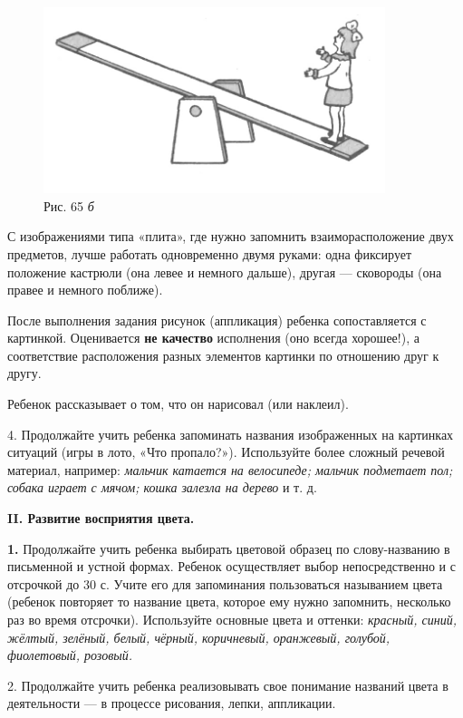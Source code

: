 \documentclass{book}
\renewcommand{\emph}[1]{\textit{#1}}
\begin{document}
\begin{figure}
\centering
\includegraphics[width=3.93174in,height=2.13694in]{media/media/image63.jpg}
\caption*{Рис. 65 \emph{б}}
\end{figure}



С изображениями типа «плита», где нужно запомнить взаиморасположение
двух предметов, лучше работать одновременно двумя руками: одна фиксирует
положение кастрюли (она левее и немного дальше), другая --- сковороды
(она правее и немного поближе).

После выполнения задания рисунок (аппликация) ребенка сопоставляется с
картинкой. Оценивается \textbf{не качество} исполнения (оно всегда
хорошее!), а соответствие расположения разных элементов картинки по
отношению друг к другу.

Ребенок рассказывает о том, что он нарисовал (или наклеил).

4. Продолжайте учить ребенка запоминать названия изображенных на
картинках ситуаций (игры в лото, «Что пропало?»). Используйте более
сложный речевой материал, например: \emph{мальчик катается на
велосипеде; мальчик подметает пол; собака играет с мячом; кошка залезла
на дерево} и т. д.

\textbf{II. Развитие восприятия цвета.}

\textbf{1.} Продолжайте учить ребенка выбирать цветовой образец по
слову-названию в письменной и устной формах. Ребенок осуществляет выбор
непосредственно и с отсрочкой до 30 с. Учите его для запоминания
пользоваться называнием цвета (ребенок повторяет то название цвета,
которое ему нужно запомнить, несколько раз во время отсрочки).
Используйте основные цвета и оттенки: \emph{красный, синий, жёлтый,
зелёный, белый, чёрный, коричневый, оранжевый, голубой, фиолетовый,
розовый.}

2. Продолжайте учить ребенка реализовывать свое понимание названий цвета
в деятельности --- в процессе рисования, лепки, аппликации.
\end{document}
